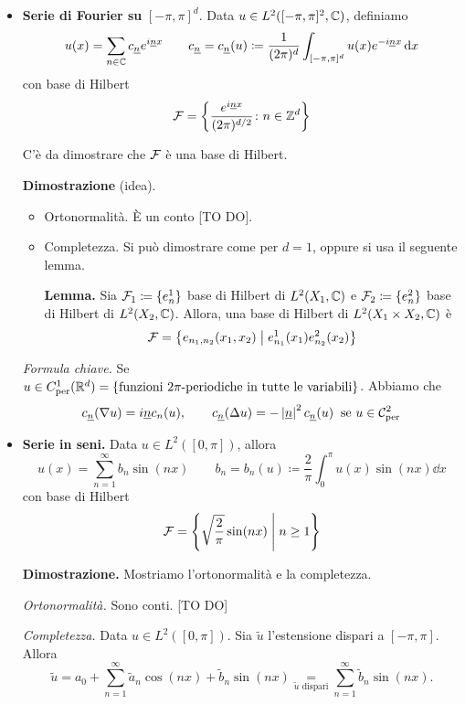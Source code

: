 \begin{itemize}

	\item \textbf{Serie di Fourier su} \boldmath$[-\pi,\pi]^d$. Data \unboldmath$u \in L^2([-\pi,\pi]^2, \mathbb C)$, definiamo
	$$
		u(x) = \sum_{n \in \mathbb C} c_{\underline{n}} e^{i \underline{n} x} \qquad 
		c_{\underline{n}} = c_{\underline{n}} (u) \coloneqq \frac{1}{(2\pi)^d} \int_{[-\pi,\pi]^d} u(x) e^{- i \underline{n} x} \,\mathrm{d} x 
	$$
	con base di Hilbert
	$$
		\mathcal{F} = \left\{ \frac{e^{i \underline{n} x}}{(2\pi)^{d/2}} \colon n \in \mathbb Z^d \right\}
	$$

	C'è da dimostrare che $\mathcal{F}$ è una base di Hilbert.

	\textbf{Dimostrazione} (idea). 
	\begin{itemize}

		\item Ortonormalità. È un conto [TO DO].


		\item Completezza. Si può dimostrare come per $d = 1$, oppure si usa il seguente lemma.

		\textbf{Lemma.} Sia $\mathcal{F}_1 \coloneqq \{ e_n^1 \}$ base di Hilbert di $L^2(X_1, \mathbb C)$ e $\mathcal{F}_2 \coloneqq \{ e_n^2 \}$ base di Hilbert di $L^2(X_2, \mathbb C)$. Allora, una base di Hilbert di $L^2(X_1 \times X_2, \mathbb C)$ è
		$$
			\mathcal{F} = \left\{ e_{n_1,n_2}(x_1,x_2) \;\middle|\; e_{n_1}^1 (x_1) e_{n_2}^2(x_2) \right\}
		$$

	\end{itemize}

	\textit{Formula chiave.}
	Se $u \in C_{\text{per}}^1 (\mathbb R^d) = \left\{ \text{funzioni $2\pi$-periodiche in tutte le variabili} \right\}$. Abbiamo che
	$$
		c_{\underline{n}} (\nabla u) = i \underline{n} c_n(u), \qquad 
		c_{\underline{n}} (\Delta u) = - \left| \underline{n} \right|^2 c_{\underline{n}} (u) \;\; \text{se }  u \in \mathcal{C}_{\text{per}}^2
	$$


	\item \textbf{Serie in seni.} Data $u \in L^2([0,\pi])$, allora 
	$$
		u(x) = \sum_{n=1}^\infty b_n \sin(nx) \qquad 
		b_n = b_n(u) \coloneqq  \frac{2}{\pi} \int_0^\pi u(x) \sin(nx) \dd x
	$$
	con base di Hilbert 
	$$
		\mathcal{F} = \left\{ \sqrt{\frac{2}{\pi}} \sin(nx) \;\middle|\; n \geq 1 \right\}
	$$

	\textbf{Dimostrazione.} Mostriamo l'ortonormalità e la completezza.

	\textit{Ortonormalità.} Sono conti. [TO DO]

	\textit{Completezza.} Data $u \in L^2([0,\pi])$. Sia $\tilde{u}$ l'estensione dispari a $[-\pi,\pi]$. Allora 
	$$
		\tilde{u} = a_0 + \sum_{n=1}^{\infty} \tilde{a}_n \cos(nx) + \tilde{b}_n \sin(nx)
		\underset{\tilde{u} \text{ dispari}} = \sum_{n=1}^{\infty} \tilde{b}_n \sin(nx).
	$$


\end{itemize}
